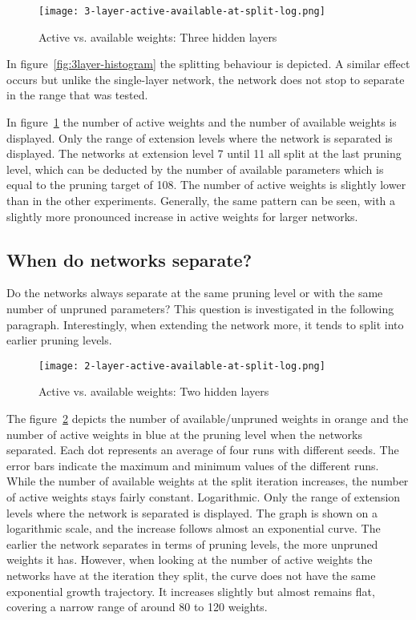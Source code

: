 \begin{figure}[ht] 
    \centering
    \texttt{[image: 3-layer-active-available-at-split-log.png]}
    \caption{
        Active vs. available weights: Three hidden layers
    }\label{fig:3layer-active}
\end{figure}

In figure~\ref{fig:3layer-histogram} the splitting behaviour is depicted.
A similar effect occurs but unlike the single-layer network, the network does not stop to separate in the range that was tested. 

In figure~\ref{fig:3layer-active} the number of active weights and the number of available weights is displayed.
Only the range of extension levels where the network is separated is displayed.
The networks at extension level 7 until 11 all split at the last pruning level, which can be deducted by the number of available parameters which is equal to the pruning target of 108.
The number of active weights is slightly lower than in the other experiments.
Generally, the same pattern can be seen, with a slightly more pronounced increase in active weights for larger networks.

\subsection{When do networks separate?}
Do the networks always separate at the same pruning level or with the same number of unpruned parameters?
This question is investigated in the following paragraph.
Interestingly, when extending the network more, it tends to split into earlier pruning levels.

\begin{figure}[ht]
    \centering
    \texttt{[image: 2-layer-active-available-at-split-log.png]}
    \caption{
        Active vs. available weights: Two hidden layers
    }\label{fig:2l-active-split}
\end{figure}

The figure~\ref{fig:2l-active-split} depicts the number of available/unpruned weights in orange and the number of active weights in blue at the pruning level when the networks separated.
Each dot represents an average of four runs with different seeds.
The error bars indicate the maximum and minimum values of the different runs.
While the number of available weights at the split iteration increases, the number of active weights stays fairly constant.
Logarithmic.
Only the range of extension levels where the network is separated is displayed.
The graph is shown on a logarithmic scale, and the increase follows almost an exponential curve.
The earlier the network separates in terms of pruning levels, the more unpruned weights it has.
However, when looking at the number of active weights the networks have at the iteration they split, the curve does not have the same exponential growth trajectory.
It increases slightly but almost remains flat, covering a narrow range of around 80 to 120 weights.

